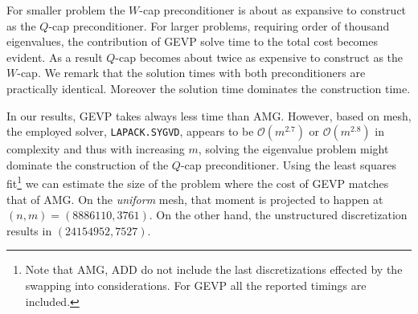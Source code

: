 \documentclass[10pt, a4paper]{article}
\begin{document}
For smaller problem the $W$-cap preconditioner is about as expansive to construct 
as the $Q$-cap preconditioner. For larger problems, requiring order of thousand
eigenvalues, the contribution of GEVP solve time to the total cost becomes
evident. As a result $Q$-cap becomes about twice as expensive to construct as the 
$W$-cap. We remark that the solution times with both preconditioners are
practically identical. Moreover the solution time dominates the construction
time.

In our results, GEVP takes always less time than AMG. However, based on mesh, 
the employed solver, \texttt{LAPACK.SYGVD}, appears to be $\mathcal{O}(m^{2.7})$
or $\mathcal{O}(m^{2.8})$ in complexity and thus with increasing $m$, solving 
the eigenvalue problem might dominate the construction of the $Q$-cap preconditioner.
Using the least squares fit\footnote{Note that AMG, ADD do not include the last
discretizations effected by the swapping into considerations. For GEVP all the
reported timings are included.} we can estimate the size of the problem where the
cost of GEVP matches that of AMG. On the \textit{uniform} mesh, that moment is
projected to happen at $(n, m)=(8886110, 3761)$. On the other hand, the
unstructured discretization results in $(24154952, 7527)$. 
\end{document}
